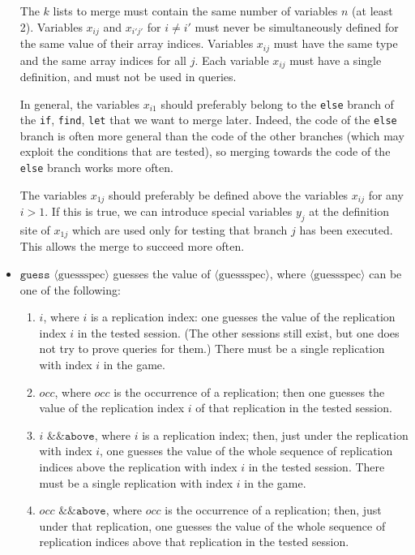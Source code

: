 \documentclass{article}
\newcommand{\nonterm}[1]{\langle\textrm{#1}\rangle}
\begin{document}
\begin{itemize}
  The $k$ lists to merge must contain the same number of variables $n$
  (at least 2). Variables $x_{ij}$ and $x_{i'j'}$ for $i \neq i'$ must
  never be simultaneously defined for the same value of their array
  indices.  Variables $x_{ij}$ must have the same type and the same
  array indices for all $j$. Each variable $x_{ij}$ must have a single
  definition, and must not be used in queries.

  In general, the variables $x_{i1}$ should preferably belong to the
  \texttt{else} branch of the {\tt if}, {\tt find}, {\tt let} that we
  want to merge later. Indeed, the code of the {\tt else} branch is
  often more general than the code of the other branches (which may
  exploit the conditions that are tested), so merging towards the code
  of the {\tt else} branch works more often.

  The variables $x_{1j}$ should preferably be defined above the
  variables $x_{ij}$ for any $i > 1$. If this is true, we can
  introduce special variables $y_j$ at the definition site of $x_{1j}$
  which are used only for testing that branch $j$ has been executed.
  This allows the merge to succeed more often.

\item $\texttt{guess }\nonterm{guessspec}$ guesses the value of $\nonterm{guessspec}$,
  where $\nonterm{guessspec}$ can be one of the following:
  \begin{enumerate}
  \item $i$, where $i$ is a replication index: one guesses the value
    of the replication index $i$ in the tested session. (The other sessions
    still exist, but one does not try to prove queries for them.) There must be
    a single replication with index $i$ in the game.

  \item $occ$, where $occ$ is the occurrence of a replication; then
    one guesses the value of the replication index $i$ of that
    replication in the tested session.

  \item $i\texttt{ \&\& above}$, where $i$ is a replication index;
    then, just under the replication with index $i$, one guesses the
    value of the whole sequence of replication indices above the
    replication with index $i$ in the tested session.  There must be a
    single replication with index $i$ in the game.

  \item $occ\texttt{ \&\& above}$, where $occ$ is the occurrence of a
    replication; then, just under that replication, one guesses the
    value of the whole sequence of replication indices above that
    replication in the tested session.


\end{enumerate}
\end{itemize}
\end{document}
